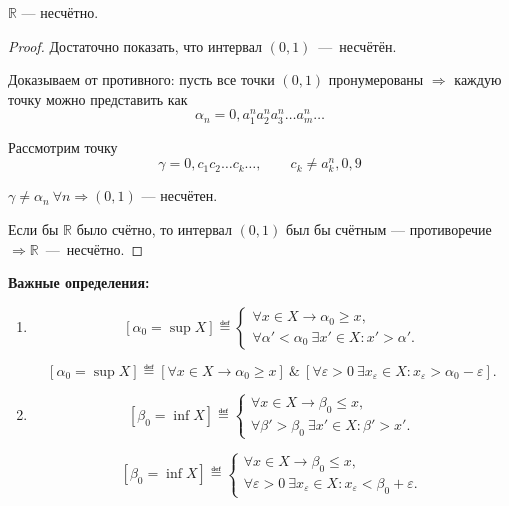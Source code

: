 \begin{theorem}
\(\mathbb{R}\) --- несчётно.
\end{theorem}

\begin{proof}
Достаточно показать, что интервал \((0, 1)\)~---~несчётён.

Доказываем от противного: пусть все точки \((0, 1)\) пронумерованы
\(\Rightarrow\) каждую точку можно представить как
\[
\alpha_n = 0{,}a_1^n a_2^n a_3^n\ldots a_m^n\ldots
\]

Рассмотрим точку
\[
\gamma = 0{,}c_1 c_2 \ldots c_k \ldots, \qquad c_k \neq a_k^n, 0, 9
\]

\(\gamma \neq \alpha_n\ \forall n \Rightarrow (0, 1)\) --- несчётен.

Если бы \(\mathbb{R}\) было счётно, то интервал \((0, 1)\) был бы счётным
--- противоречие \(\Rightarrow \mathbb{R}\)~---~несчётно.
\end{proof}


\noindent\textbf{Важные определения:}

\begin{enumerate}
\item
\[
[\alpha_0 = \sup X] \eqdef
\begin{cases}
\forall x \in X \to \alpha_0 \ge x,\\
\forall \alpha' < \alpha_0 \ \exists x' \in X: x' > \alpha'.
\end{cases}
\]

\[
[\alpha_0 = \sup X] \eqdef  
[\forall x \in X \to \alpha_0 \ge x] \ \&\
[\forall \varepsilon > 0 \ \exists x_\varepsilon \in X: x_\varepsilon >
\alpha_0 - \varepsilon].
\]

\item 
\[
[\beta_0 = \inf X] \eqdef
\begin{cases}
\forall x \in X \to \beta_0 \le x,\\
\forall \beta' > \beta_0 \ \exists x' \in X: \beta' > x'.
\end{cases}
\]

\[
[\beta_0 = \inf X] \eqdef
\begin{cases}
\forall x \in X \to \beta_0 \le x,\\
\forall \varepsilon > 0 \ \exists x_\varepsilon \in X: x_\varepsilon < \beta_0
+ \varepsilon.
\end{cases}
\]

\end{enumerate}

